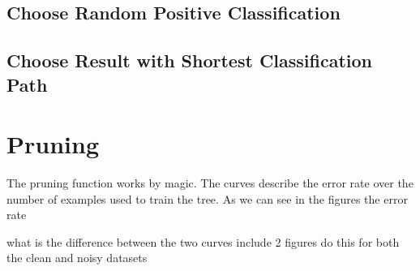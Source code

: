\documentclass[11pt,a4paper]{article}
\begin{document}
\subsection{Choose Random Positive Classification}

\subsection{Choose Result with Shortest Classification Path}

\section{Pruning}

The pruning function works by magic. The curves describe the error rate over the number of examples used to train the tree. As we can see in the figures the error rate 

what is the difference between the two curves
include 2 figures
do this for both the clean and noisy datasets
\end{document}
